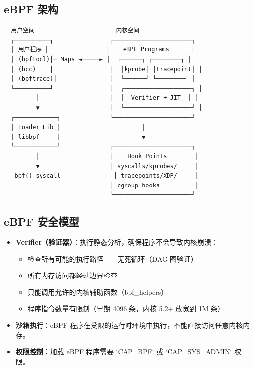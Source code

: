 \documentclass[12pt,UTF8]{ctexbook}
\begin{document}
\subsection*{eBPF 架构}

\begin{lstlisting}
  用户空间                       内核空间
  ┌──────────┐                ┌──────────────────────┐
  │ 用户程序 │                │    eBPF Programs      │
  │ (bpftool)│─ Maps ◄─────► │  ┌──────┐ ┌────────┐ │
  │ (bcc)    │                │  │kprobe│ │tracepoint│ │
  │ (bpftrace)│               │  └──────┘ └────────┘ │
  └──────────┘                │  ┌───────────────────┐ │
         │                    │  │  Verifier + JIT  │ │
         ▼                    │  └───────────────────┘ │
  ┌────────────┐              └──────────────────────┘
  │ Loader Lib │                       │
  │ libbpf     │                       ▼
  └────────────┘              ┌──────────────────────┐
         │                    │    Hook Points        │
         ▼                    │ syscalls/kprobes/     │
   bpf() syscall               │ tracepoints/XDP/     │
                              │ cgroup hooks          │
                              └──────────────────────┘
\end{lstlisting}

\subsection*{eBPF 安全模型}

\begin{itemize}
    \item \textbf{Verifier（验证器）}：执行静态分析，确保程序不会导致内核崩溃：
    \begin{itemize}
        \item 检查所有可能的执行路径——无死循环（DAG 图验证）
        \item 所有内存访问都经过边界检查
        \item 只能调用允许的内核辅助函数（bpf\_helpers）
        \item 程序指令数量有限制（早期 4096 条，内核 5.2+ 放宽到 1M 条）
    \end{itemize}
    \item \textbf{沙箱执行}：eBPF 程序在受限的运行时环境中执行，不能直接访问任意内核内存。
    \item \textbf{权限控制}：加载 eBPF 程序需要 `CAP\_BPF` 或 `CAP\_SYS\_ADMIN` 权限。
\end{itemize}
\end{document}
